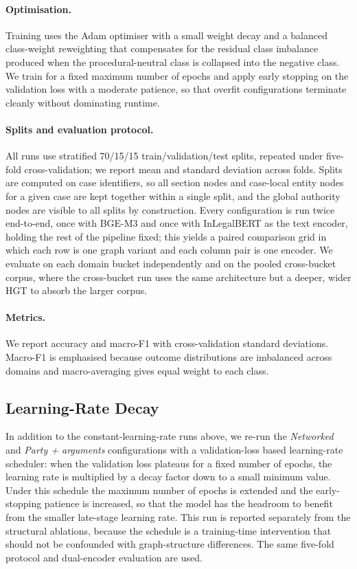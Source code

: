 \documentclass[runningheads]{llncs}
\begin{document}
\paragraph{Optimisation.}
Training uses the Adam optimiser with a small weight decay and a balanced class-weight reweighting that compensates for the residual class imbalance produced when the procedural-neutral class is collapsed into the negative class. We train for a fixed maximum number of epochs and apply early stopping on the validation loss with a moderate patience, so that overfit configurations terminate cleanly without dominating runtime.

\paragraph{Splits and evaluation protocol.}
All runs use stratified 70/15/15 train/validation/test splits, repeated under five-fold cross-validation; we report mean and standard deviation across folds. Splits are computed on case identifiers, so all section nodes and case-local entity nodes for a given case are kept together within a single split, and the global authority nodes are visible to all splits by construction. Every configuration is run twice end-to-end, once with BGE-M3 and once with InLegalBERT as the text encoder, holding the rest of the pipeline fixed; this yields a paired comparison grid in which each row is one graph variant and each column pair is one encoder. We evaluate on each domain bucket independently and on the pooled cross-bucket corpus, where the cross-bucket run uses the same architecture but a deeper, wider HGT to absorb the larger corpus.

\paragraph{Metrics.}
We report accuracy and macro-F1 with cross-validation standard deviations. Macro-F1 is emphasised because outcome distributions are imbalanced across domains and macro-averaging gives equal weight to each class.

\subsection{Learning-Rate Decay}
\label{subsec:pipeline-lr-decay}

In addition to the constant-learning-rate runs above, we re-run the \emph{Networked} and \emph{Party + arguments} configurations with a validation-loss based learning-rate scheduler: when the validation loss plateaus for a fixed number of epochs, the learning rate is multiplied by a decay factor down to a small minimum value. Under this schedule the maximum number of epochs is extended and the early-stopping patience is increased, so that the model has the headroom to benefit from the smaller late-stage learning rate. This run is reported separately from the structural ablations, because the schedule is a training-time intervention that should not be confounded with graph-structure differences. The same five-fold protocol and dual-encoder evaluation are used.
\end{document}
